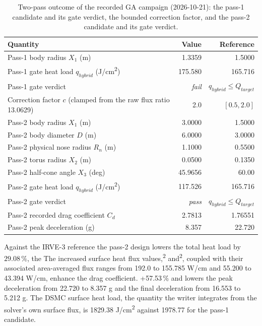 \begin{table}[htbp]
    \centering
    \caption{Two-pass outcome of the recorded GA campaign (2026-10-21): the pass-1 candidate and its
    gate verdict, the bounded correction factor, and the pass-2 candidate and its gate verdict.}
    \label{tab:ga_two_pass}
    \begin{tabularx}{\textwidth}{Xrr}
        \toprule
        \textbf{Quantity} & \textbf{Value} & \textbf{Reference} \\
        \midrule
        Pass-1 body radius $X_1$ (m) & 1.3359 & 1.5000 \\
        Pass-1 gate heat load $q_{hybrid}$ (J/cm\textsuperscript{2}) & 175.580 & 165.716 \\
        Pass-1 gate verdict & \emph{fail} & $q_{hybrid} \leq Q_{target}$ \\
        Correction factor $c$ (clamped from the raw flux ratio 13.0629) & 2.0 & $[0.5, 2.0]$ \\
        Pass-2 body radius $X_1$ (m) & 3.0000 & 1.5000 \\
        Pass-2 body diameter $D$ (m) & 6.0000 & 3.0000 \\
        Pass-2 physical nose radius $R_n$ (m) & 1.1000 & 0.5500 \\
        Pass-2 torus radius $X_2$ (m) & 0.0500 & 0.1350 \\
        Pass-2 half-cone angle $X_3$ (deg) & 45.9656 & 60.00 \\
        Pass-2 gate heat load $q_{hybrid}$ (J/cm\textsuperscript{2}) & 117.526 & 165.716 \\
        Pass-2 gate verdict & \emph{pass} & $q_{hybrid} \leq Q_{target}$ \\
        Pass-2 recorded drag coefficient $C_d$ & 2.7813 & 1.76551 \\
        Pass-2 peak deceleration (g) & 8.357 & 22.720 \\
        \bottomrule
    \end{tabularx}
\end{table}

Against the IRVE-3 reference the pass-2 design lowers the total heat load by $29.08\,\%$, the
The increased surface heat flux values,\textsuperscript{2} and\textsuperscript{2}, coupled with their associated area-averaged flux ranges from 192.0 to 155.785 W/cm and 55.200 to 43.394 W/cm, enhance the drag coefficient.
+57.53\,\% and lowers the peak deceleration from 22.720 to 8.357 g and the final
deceleration from 16.553 to 5.212 g. The DSMC surface heat load, the quantity the writer integrates from the solver's own surface flux, is 1829.38 J/cm\textsuperscript{2} against 1978.77 for the pass-1 candidate.

